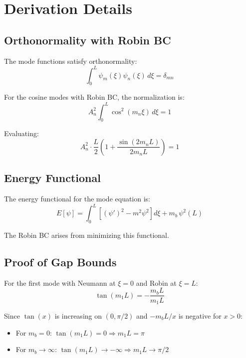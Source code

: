\documentclass[11pt,a4paper]{article}
\newcommand{\mb}{m_b}
\theoremstyle{definition}
\theoremstyle{plain}
\theoremstyle{remark}
\begin{document}
\section{Derivation Details}
\label{app:derivation}

\subsection{Orthonormality with Robin BC}

The mode functions satisfy orthonormality:
\begin{equation}
\int_0^L \psi_m(\xi)\psi_n(\xi)\,d\xi = \delta_{mn}
\label{eq:orthonorm}
\end{equation}

For the cosine modes with Robin BC, the normalization is:
\begin{equation}
A_n^2 \int_0^L \cos^2(m_n\xi)\,d\xi = 1
\label{eq:norm-integral}
\end{equation}

Evaluating:
\begin{equation}
A_n^2 \cdot \frac{L}{2}\left(1 + \frac{\sin(2m_n L)}{2m_n L}\right) = 1
\label{eq:norm-evaluated}
\end{equation}

\subsection{Energy Functional}

The energy functional for the mode equation is:
\begin{equation}
E[\psi] = \int_0^L \left[ (\psi')^2 - m^2\psi^2 \right] d\xi + \mb\,\psi^2(L)
\label{eq:energy-functional}
\end{equation}

The Robin BC arises from minimizing this functional.

\subsection{Proof of Gap Bounds}

For the first mode with Neumann at $\xi=0$ and Robin at $\xi=L$:
\begin{equation}
\tan(m_1 L) = -\frac{\mb L}{m_1 L}
\label{eq:first-mode}
\end{equation}

Since $\tan(x)$ is increasing on $(0, \pi/2)$ and $-\mb L/x$ is negative for $x > 0$:
\begin{itemize}
\item For $\mb = 0$: $\tan(m_1 L) = 0 \Rightarrow m_1 L = \pi$
\item For $\mb \to \infty$: $\tan(m_1 L) \to -\infty \Rightarrow m_1 L \to \pi/2$
\end{itemize}
\end{document}
